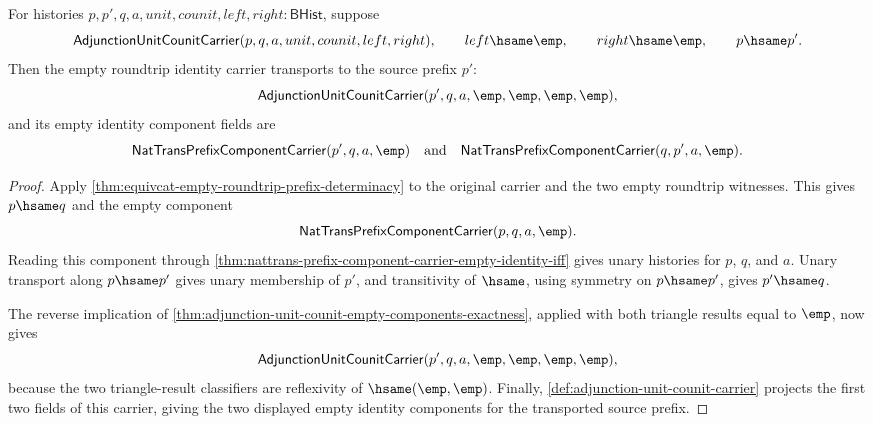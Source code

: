 \begin{theorem}
\label{thm:equivcat-empty-roundtrip-identity-carrier-source-prefix-hsame-transport}
For histories $p,p',q,a,unit,counit,left,right:\mathsf{BHist}$, suppose
$$
\mathsf{AdjunctionUnitCounitCarrier}(p,q,a,unit,counit,left,right),
\qquad
left\hsame\emp,
\qquad
right\hsame\emp,
\qquad
p\hsame p'.
$$
Then the empty roundtrip identity carrier transports to the source prefix $p'$:
$$
\mathsf{AdjunctionUnitCounitCarrier}(p',q,a,\emp,\emp,\emp,\emp),
$$
and its empty identity component fields are
$$
\mathsf{NatTransPrefixComponentCarrier}(p',q,a,\emp)
\quad\text{and}\quad
\mathsf{NatTransPrefixComponentCarrier}(q,p',a,\emp).
$$
\end{theorem}
\begin{proof}
Apply \autoref{thm:equivcat-empty-roundtrip-prefix-determinacy} to the original carrier and the two empty roundtrip witnesses. This gives $p\hsame q$ and the empty component
$$
\mathsf{NatTransPrefixComponentCarrier}(p,q,a,\emp).
$$
Reading this component through \autoref{thm:nattrans-prefix-component-carrier-empty-identity-iff} gives unary histories for $p$, $q$, and $a$. Unary transport along $p\hsame p'$ gives unary membership of $p'$, and transitivity of $\hsame$, using symmetry on $p\hsame p'$, gives $p'\hsame q$.

The reverse implication of \autoref{thm:adjunction-unit-counit-empty-components-exactness}, applied with both triangle results equal to $\emp$, now gives
$$
\mathsf{AdjunctionUnitCounitCarrier}(p',q,a,\emp,\emp,\emp,\emp),
$$
because the two triangle-result classifiers are reflexivity of $\hsame(\emp,\emp)$. Finally, \autoref{def:adjunction-unit-counit-carrier} projects the first two fields of this carrier, giving the two displayed empty identity components for the transported source prefix.
\end{proof}


